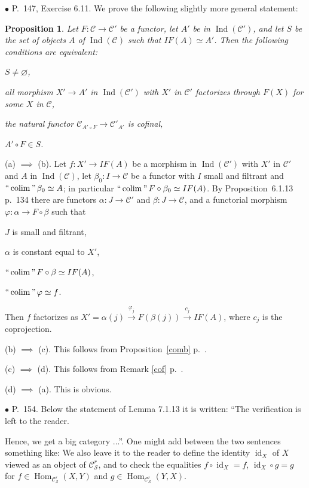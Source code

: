 \documentclass[12pt]{article}
\newtheorem{prop}[thm]{Proposition}
\theoremstyle{remark}%
\newcommand{\bu}{\bullet}
\newcommand{\n}{\noindent}
\newcommand{\cc}{\mathcal}
\newcommand{\C}{\mathcal C}
\newcommand{\p}{\varphi}
\newcommand{\xr}{\xrightarrow}
\newcommand{\pr}{Proposition}
\DeclareMathOperator*{\coli}{colim}
\DeclareMathOperator*{\ic}{``\coli"}
\DeclareMathOperator{\id}{id}
\DeclareMathOperator{\Hom}{Hom}
\DeclareMathOperator{\Ind}{Ind}
\begin{document}
\n$\bu$ P.~147, Exercise 6.11. We prove the following slightly more general statement: 
% 
\begin{prop}
%
Let $F:\cc C\to\cc C'$ be a functor, let $A'$ be in $\Ind(\cc C')$, and let $S$ be the set of objects $A$ of $\Ind(\cc C)$ such that $IF(A)\simeq A'$. Then the following conditions are equivalent: 

\n{\em(a)} $S\neq\varnothing$, 

\n{\em(b)} all morphism $X'\to A'$ in $\Ind(\cc C')$ with $X'$ in $\cc C'$ factorizes through $F(X)$ for some $X$ in $\cc C$, 

\n{\em(c)} the natural functor $\cc C_{A'\circ F}\to\cc C'_{A'}$ is cofinal, 

\n{\em(d)} $A'\circ F\in S$.
%
\end{prop}
%
\n{\em Proof.} 

\n(a) $\implies$ (b). Let $f:X'\to IF(A)$ be a morphism in $\Ind(\cc C')$ with $X'$ in $\cc C'$ and $A$ in $\Ind(\cc C)$, let $\beta_0:I\to\cc C$ be a functor with $I$ small and filtrant and $\ic\beta_0\simeq A$; in particular $\ic F\circ\beta_0\simeq IF(A)$. By \pr\ 6.1.13 p.~134 there are functors $\alpha:J\to\cc C'$ and $\beta:J\to\cc C$, and a functorial morphism $\p:\alpha\to F\circ\beta$ such that 

$J$ is small and filtrant, 

$\alpha$ is constant equal to $X'$, 

$\ic F\circ\beta\simeq IF(A)$, 

$\ic\p\simeq f$. 

\n Then $f$ factorizes as $X'=\alpha(j)\xr{\p_j}F(\beta(j))\xr{c_j}IF(A)$, where $c_j$ is the coprojection. 

\n(b) $\implies$ (c). This follows from \pr\ \ref{comb} p.~\pageref{comb}. 

\n(c) $\implies$ (d). This follows from Remark \ref{cof} p.~\pageref{cof}. 

\n(d) $\implies$ (a). This is obvious. 


\n$\bu$ P.~154. Below the statement of Lemma 7.1.13 it is written: ``The verification is left to the reader.

Hence, we get a big category ...''. One might add between the two sentences something like: We also leave it to the reader to define the identity $\id_X$ of $X$ viewed as an object of $\C^r_{\mathcal S}$, and to check the equalities $f\circ\id_X=f$, $\id_X\circ g=g$ for $f\in\Hom_{\C^r_{\mathcal S}}(X,Y)$ and $g\in\Hom_{\C^r_{\mathcal S}}(Y,X)$. 
\end{document}
